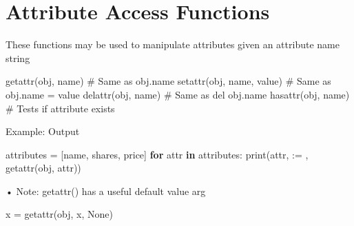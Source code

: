 \documentclass[
  letterpaper,
  DIV=11,
  numbers=noendperiod]{scrreprt}
\newenvironment{Shaded}{\begin{snugshade}}{\end{snugshade}}
\newcommand{\BuiltInTok}[1]{\textcolor[rgb]{0.00,0.23,0.31}{#1}}
\newcommand{\CommentTok}[1]{\textcolor[rgb]{0.37,0.37,0.37}{#1}}
\newcommand{\ControlFlowTok}[1]{\textcolor[rgb]{0.00,0.23,0.31}{\textbf{#1}}}
\newcommand{\KeywordTok}[1]{\textcolor[rgb]{0.00,0.23,0.31}{\textbf{#1}}}
\newcommand{\NormalTok}[1]{\textcolor[rgb]{0.00,0.23,0.31}{#1}}
\newcommand{\OperatorTok}[1]{\textcolor[rgb]{0.37,0.37,0.37}{#1}}
\newcommand{\StringTok}[1]{\textcolor[rgb]{0.13,0.47,0.30}{#1}}
\begin{document}

\chapter{Attribute Access Functions}\label{attribute-access-functions}

These functions may be used to manipulate attributes given an attribute
name string

\begin{Shaded}
\begin{Highlighting}[]
\BuiltInTok{getattr}\NormalTok{(obj, }\StringTok{\textquotesingle{}name\textquotesingle{}}\NormalTok{) }\CommentTok{\# Same as obj.name  }
\BuiltInTok{setattr}\NormalTok{(obj, }\StringTok{\textquotesingle{}name\textquotesingle{}}\NormalTok{, value) }\CommentTok{\# Same as obj.name = value  }
\BuiltInTok{delattr}\NormalTok{(obj, }\StringTok{\textquotesingle{}name\textquotesingle{}}\NormalTok{) }\CommentTok{\# Same as del obj.name  }
\BuiltInTok{hasattr}\NormalTok{(obj, }\StringTok{\textquotesingle{}name\textquotesingle{}}\NormalTok{) }\CommentTok{\# Tests if attribute exists }
\end{Highlighting}
\end{Shaded}

Example: Output

\begin{Shaded}
\begin{Highlighting}[]
\NormalTok{attributes }\OperatorTok{=}\NormalTok{ [}\StringTok{\textquotesingle{}name\textquotesingle{}}\NormalTok{, }\StringTok{\textquotesingle{}shares\textquotesingle{}}\NormalTok{, }\StringTok{\textquotesingle{}price\textquotesingle{}}\NormalTok{]}
\ControlFlowTok{for}\NormalTok{ attr }\KeywordTok{in}\NormalTok{ attributes:}
    \BuiltInTok{print}\NormalTok{(attr, }\StringTok{\textquotesingle{}:=\textquotesingle{}}\NormalTok{ , }\BuiltInTok{getattr}\NormalTok{(obj, attr)) }
\end{Highlighting}
\end{Shaded}

• Note: getattr() has a useful default value arg

\begin{Shaded}
\begin{Highlighting}[]
\NormalTok{x = getattr(obj, \textquotesingle{}x\textquotesingle{}, None) }
\end{Highlighting}
\end{Shaded}

\end{document}
